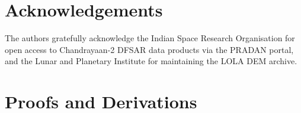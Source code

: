 \documentclass[10pt,conference]{IEEEtran}
\begin{document}
\section*{Acknowledgements}

The authors gratefully acknowledge the Indian Space Research Organisation
for open access to Chandrayaan-2 DFSAR data products via the PRADAN
portal, and the Lunar and Planetary Institute for maintaining the
LOLA DEM archive.




\appendices
\section{Proofs and Derivations}
\label{app:proofs}
\end{document}
